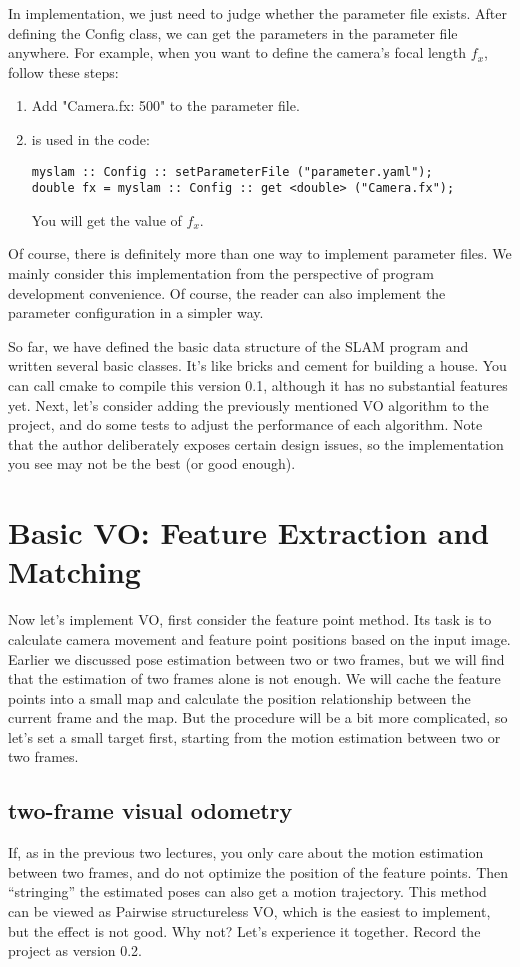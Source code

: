In implementation, we just need to judge whether the parameter file exists. After defining the Config class, we can get the parameters in the parameter file anywhere. For example, when you want to define the camera's focal length $ f_x $, follow these steps:

\begin{enumerate}
\item Add "Camera.fx: 500" to the parameter file.
\item is used in the code:
\begin{lstlisting}[language = c ++]
myslam :: Config :: setParameterFile ("parameter.yaml");
double fx = myslam :: Config :: get <double> ("Camera.fx");
\end{lstlisting}
You will get the value of $ f_x $.
\end{enumerate}
Of course, there is definitely more than one way to implement parameter files. We mainly consider this implementation from the perspective of program development convenience. Of course, the reader can also implement the parameter configuration in a simpler way.

So far, we have defined the basic data structure of the SLAM program and written several basic classes. It's like bricks and cement for building a house. You can call cmake to compile this version 0.1, although it has no substantial features yet. Next, let's consider adding the previously mentioned VO algorithm to the project, and do some tests to adjust the performance of each algorithm. Note that the author deliberately exposes certain design issues, so the implementation you see may not be the best (or good enough).

\section{Basic VO: Feature Extraction and Matching}
Now let's implement VO, first consider the feature point method. Its task is to calculate camera movement and feature point positions based on the input image. Earlier we discussed pose estimation between two or two frames, but we will find that the estimation of two frames alone is not enough. We will cache the feature points into a small map and calculate the position relationship between the current frame and the map. But the procedure will be a bit more complicated, so let's set a small target first, starting from the motion estimation between two or two frames.

\subsection{two-frame visual odometry}
If, as in the previous two lectures, you only care about the motion estimation between two frames, and do not optimize the position of the feature points. Then “stringing” the estimated poses can also get a motion trajectory. This method can be viewed as Pairwise structureless VO, which is the easiest to implement, but the effect is not good. Why not? Let's experience it together. Record the project as version 0.2.

